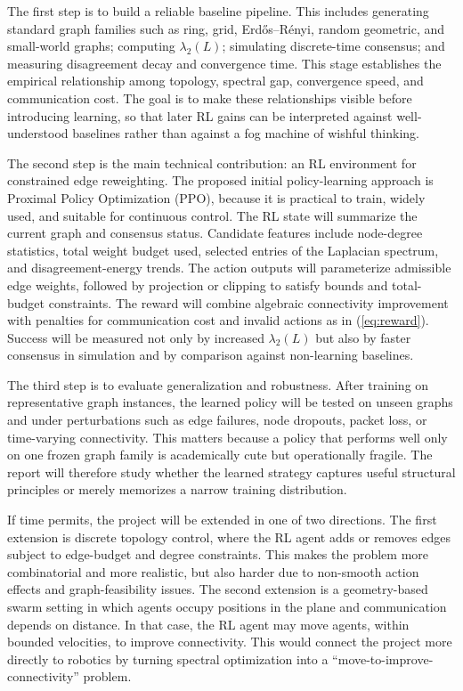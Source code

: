\documentclass[letterpaper, 11 pt, journal, twoside]{IEEEtran}
\def\rep#1{(\ref{#1})}
\begin{document}
The first step is to build a reliable baseline pipeline. This includes generating standard graph families such as ring, grid, Erd\H{o}s--R\'enyi, random geometric, and small-world graphs; computing $\lambda_2(L)$; simulating discrete-time consensus; and measuring disagreement decay and convergence time. This stage establishes the empirical relationship among topology, spectral gap, convergence speed, and communication cost. The goal is to make these relationships visible before introducing learning, so that later RL gains can be interpreted against well-understood baselines rather than against a fog machine of wishful thinking.

The second step is the main technical contribution: an RL environment for constrained edge reweighting. The proposed initial policy-learning approach is Proximal Policy Optimization (PPO), because it is practical to train, widely used, and suitable for continuous control. The RL state will summarize the current graph and consensus status. Candidate features include node-degree statistics, total weight budget used, selected entries of the Laplacian spectrum, and disagreement-energy trends. The action outputs will parameterize admissible edge weights, followed by projection or clipping to satisfy bounds and total-budget constraints. The reward will combine algebraic connectivity improvement with penalties for communication cost and invalid actions as in \rep{eq:reward}. Success will be measured not only by increased $\lambda_2(L)$ but also by faster consensus in simulation and by comparison against non-learning baselines.

The third step is to evaluate generalization and robustness. After training on representative graph instances, the learned policy will be tested on unseen graphs and under perturbations such as edge failures, node dropouts, packet loss, or time-varying connectivity. This matters because a policy that performs well only on one frozen graph family is academically cute but operationally fragile. The report will therefore study whether the learned strategy captures useful structural principles or merely memorizes a narrow training distribution.

If time permits, the project will be extended in one of two directions. The first extension is discrete topology control, where the RL agent adds or removes edges subject to edge-budget and degree constraints. This makes the problem more combinatorial and more realistic, but also harder due to non-smooth action effects and graph-feasibility issues. The second extension is a geometry-based swarm setting in which agents occupy positions in the plane and communication depends on distance. In that case, the RL agent may move agents, within bounded velocities, to improve connectivity. This would connect the project more directly to robotics by turning spectral optimization into a ``move-to-improve-connectivity'' problem.
\end{document}
